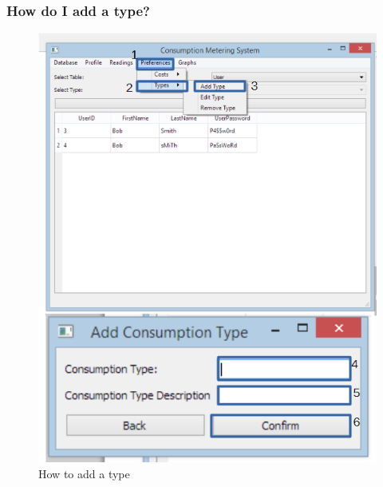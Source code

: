 \subsubsection{How do I add a type?}\label{question:add_type}
\begin{figure}[H]
	\includegraphics{./manual/images/add_type.png}
	\caption{How to add a type}
\end{figure}

